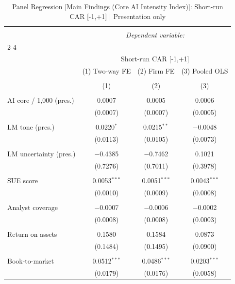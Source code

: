 
\begin{table}[!htbp] \centering 
  \caption{Panel Regression [Main Findings (Core AI Intensity Index)]: Short-run CAR [-1,+1]  |  Presentation only} 
  \label{} 
\begin{tabular}{@{\extracolsep{5pt}}lccc} 
\\[-1.8ex]\hline 
\hline \\[-1.8ex] 
 & \multicolumn{3}{c}{\textit{Dependent variable:}} \\ 
\cline{2-4} 
\\[-1.8ex] & \multicolumn{3}{c}{Short-run CAR [-1,+1]} \\ 
 & (1) Two-way FE & (2) Firm FE & (3) Pooled OLS \\ 
\\[-1.8ex] & (1) & (2) & (3)\\ 
\hline \\[-1.8ex] 
 AI core / 1,000 (pres.) & 0.0007 & 0.0005 & 0.0006 \\ 
  & (0.0007) & (0.0007) & (0.0005) \\ 
  & & & \\ 
 LM tone (pres.) & 0.0220$^{*}$ & 0.0215$^{**}$ & $-$0.0048 \\ 
  & (0.0113) & (0.0105) & (0.0073) \\ 
  & & & \\ 
 LM uncertainty (pres.) & $-$0.4385 & $-$0.7462 & 0.1021 \\ 
  & (0.7276) & (0.7011) & (0.3978) \\ 
  & & & \\ 
 SUE score & 0.0053$^{***}$ & 0.0051$^{***}$ & 0.0043$^{***}$ \\ 
  & (0.0010) & (0.0009) & (0.0008) \\ 
  & & & \\ 
 Analyst coverage & $-$0.0007 & $-$0.0006 & $-$0.0002 \\ 
  & (0.0008) & (0.0008) & (0.0003) \\ 
  & & & \\ 
 Return on assets & 0.1580 & 0.1584 & 0.0873 \\ 
  & (0.1484) & (0.1495) & (0.0900) \\ 
  & & & \\ 
 Book-to-market & 0.0512$^{***}$ & 0.0486$^{***}$ & 0.0203$^{***}$ \\ 
  & (0.0179) & (0.0176) & (0.0058) \\ 

\end{tabular}
\end{table}
